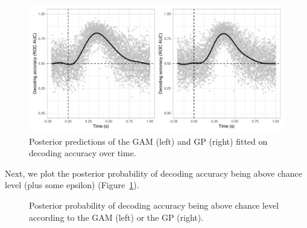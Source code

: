 \documentclass[
  doc,
  floatsintext,
  longtable,
  a4paper,
  nolmodern,
  notxfonts,
  notimes,
  colorlinks=true,linkcolor=blue,citecolor=blue,urlcolor=blue]{apa7}
\begin{document}
\begin{figure}[H]

\caption{Posterior predictions of the GAM (left) and GP (right) fitted
on decoding accuracy over time.}

{\centering \includegraphics[width=1\textwidth,height=\textheight]{brms_meeg_files/figure-pdf/decoding-preds-1.pdf}

}

\end{figure}%

Next, we plot the posterior probability of decoding accuracy being above
chance level (plus some epsilon) (Figure~\ref{fig-decoding-post}).

\begin{figure}[!htb]

\caption{\label{fig-decoding-post}Posterior probability of decoding
accuracy being above chance level according to the GAM (left) or the GP
(right).}


\end{figure}%
\end{document}
